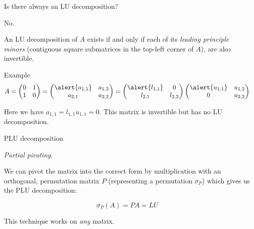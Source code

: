 \documentclass{beamer}
\begin{document}
\begin{frame}{Is there always an LU decomposition?}

    \alert{No.}

    An LU decomposition of $A$ exists if and only if each of its \emph{leading principle minors}
    (contiguous square submatrices in the top-left corner of $A$),
    are also invertible.

    \pause{}

    \begin{exampleblock}{Example}
        \[
            A = \begin{pmatrix}{}
                0 & 1 \\
                1 & 0
            \end{pmatrix} 

            = \begin{pmatrix}{}
                \alert{a_{1,1}} & a_{1,2} \\
                a_{2,1} & a_{2,2}
            \end{pmatrix}
            = \begin{pmatrix}{}
                \alert{l_{1,1}} & 0 \\
                l_{2,1} & l_{2,2}
            \end{pmatrix}
            \begin{pmatrix}{}
                \alert{u_{1,1}} & u_{1,2} \\
                0 & u_{2,2}
            \end{pmatrix}
        \]

        Here we have $a_{1,1} = l_{1,1}u_{1,1} = 0.$
        \bigbreak
        This matrix is invertible but has no LU decomposition.
    \end{exampleblock}

    \pause{}


\end{frame}

\begin{frame}{PLU decomposition}

    \emph{Partial pivoting}.

    We can pivot the matrix into the correct form by multiplication with
    an orthogonal, permutation matrix $P$ (representing a permutation $\sigma_P$)
    which gives us the PLU decomposition:

    \[
        \sigma_P(A) = PA = LU
    \]

    \pause{}

    \begin{block}{}
        This technique works on \emph{any} matrix.
    \end{block}

\end{frame}
\end{document}
